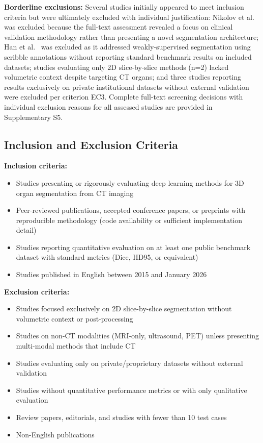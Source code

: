 \documentclass[conference]{IEEEtran}
\begin{document}
\textbf{Borderline exclusions:} Several studies initially appeared to meet inclusion criteria but were ultimately excluded with individual justification: Nikolov et al.\ \cite{nikolov2021clinically} was excluded because the full-text assessment revealed a focus on clinical validation methodology rather than presenting a novel segmentation architecture; Han et al.\ \cite{han2023scribble} was excluded as it addressed weakly-supervised segmentation using scribble annotations without reporting standard benchmark results on included datasets; studies evaluating only 2D slice-by-slice methods (n=2) lacked volumetric context despite targeting CT organs; and three studies reporting results exclusively on private institutional datasets without external validation were excluded per criterion EC3. Complete full-text screening decisions with individual exclusion reasons for all assessed studies are provided in Supplementary S5.


\subsection{Inclusion and Exclusion Criteria}

\textbf{Inclusion criteria:}
\begin{itemize}
    \item Studies presenting or rigorously evaluating deep learning methods for 3D organ segmentation from CT imaging
    \item Peer-reviewed publications, accepted conference papers, or preprints with reproducible methodology (code availability or sufficient implementation detail)
    \item Studies reporting quantitative evaluation on at least one public benchmark dataset with standard metrics (Dice, HD95, or equivalent)
    \item Studies published in English between 2015 and January 2026
\end{itemize}

\textbf{Exclusion criteria:}
\begin{itemize}
    \item Studies focused exclusively on 2D slice-by-slice segmentation without volumetric context or post-processing
    \item Studies on non-CT modalities (MRI-only, ultrasound, PET) unless presenting multi-modal methods that include CT
    \item Studies evaluating only on private/proprietary datasets without external validation
    \item Studies without quantitative performance metrics or with only qualitative evaluation
    \item Review papers, editorials, and studies with fewer than 10 test cases
    \item Non-English publications
\end{itemize}
\end{document}
